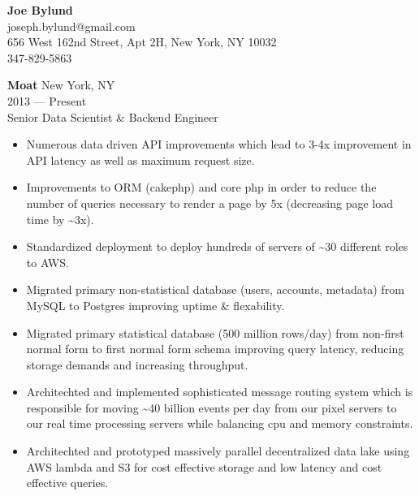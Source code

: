 
\begin{center}
\myfontsize{\bigheader}
\textbf{Joe Bylund}\\
\myfontsize{\bodysize}
joseph.bylund@gmail.com\\
656 West 162nd Street, Apt 2H, New York, NY 10032\\
347-829-5863\hspace{3ex}\\
\end{center}

\hrulefill
\vspace{\littleskip}



\myfontsize{\bigheader}
\textbf{Moat}
\myfontsize{\bodysize}
New York, NY\\
2013 --- Present\\
Senior Data Scientist \& Backend Engineer\\

\begin{itemize}[topsep=1ex, partopsep=0ex, parsep=0ex, itemsep=0.5ex]
    \item Numerous data driven API improvements which lead to 3-4x improvement in API latency as well as maximum request size.
    \item Improvements to ORM (cakephp) and core php in order to reduce the number of queries necessary to render a page by 5x (decreasing page load time by \textasciitilde{}3x).
    \item Standardized deployment to deploy hundreds of servers of \textasciitilde{}30 different roles to AWS.
    \item Migrated primary non-statistical database (users, accounts, metadata) from MySQL to Postgres improving uptime \& flexability.
    \item Migrated primary statistical database (500 million rows/day) from non-first normal form to first normal form schema improving query latency, reducing storage demands and increasing throughput.
    \item Architechted and implemented sophisticated message routing system which is responsible for moving \textasciitilde{}40 billion events per day from our pixel servers to our real time processing servers while balancing cpu and memory constraints.
    \item Architechted and prototyped massively parallel decentralized data lake using AWS lambda and S3 for cost effective storage and low latency and cost effective queries.
\end{itemize}

